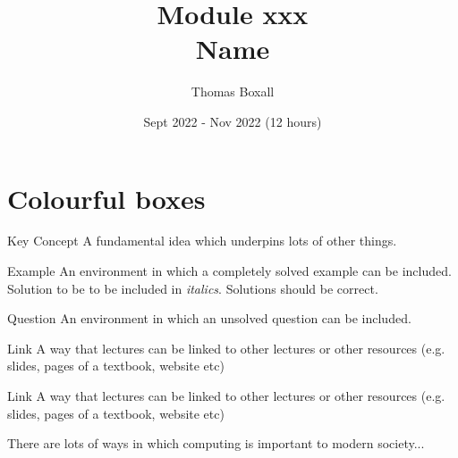 \documentclass[a4paper, 11pt]{report}
\title{\textbf{Module xxx}\\Name}
\author{Thomas Boxall}
\date{Sept 2022 - Nov 2022 (12 hours)}
\begin{document}
\maketitle
\tableofcontents
\chapter*{Colourful boxes}
    

    \begin{keyconcept}{Key Concept}
    A fundamental idea which underpins lots of other things.
    \end{keyconcept}

    \begin{example}{Example}
        An environment in which a completely solved example can be included. Solution to be to be included in \textit{italics}. Solutions should be correct.
    \end{example}

    \begin{question}{Question}
        An environment in which an unsolved question can be included. 
    \end{question}

    \begin{link}{Link}
        A way that lectures can be linked to other lectures or other resources (e.g. slides, pages of a textbook, website etc)
    \end{link}

    

    \begin{link}{Link}
        A way that lectures can be linked to other lectures or other resources (e.g. slides, pages of a textbook, website etc)
    \end{link}
    There are lots of ways in which computing is important to modern society...
\end{document}

